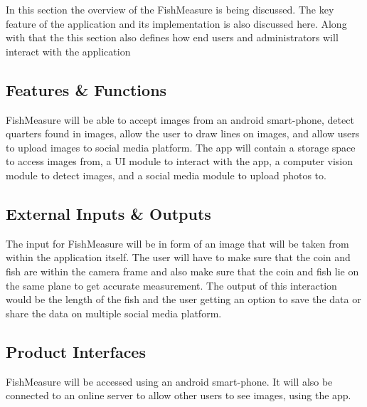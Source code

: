 In this section the overview of the FishMeasure is being discussed. The key feature of the application and its implementation is also discussed here. Along with that the this section also defines how end users and administrators will interact with the application

\subsection{Features \& Functions}
FishMeasure will be able to accept images from an android smart-phone, detect quarters found in images, allow the user to draw lines on images, and allow users to upload images to social media platform. The app will contain a storage space to access images from, a UI module to interact with the app, a computer vision module to detect images, and a social media module to upload photos to.

\subsection{External Inputs \& Outputs}
The input for FishMeasure will be in form of an image that will be taken from within the application itself. The user will have to make sure that the coin and fish are within the camera frame and also make sure that the coin and fish lie on the same plane to get accurate measurement. The output of this interaction would be the length of the fish and the user getting an option to save the data or share the data on multiple social media platform.

\subsection{Product Interfaces}
FishMeasure will be accessed using an android smart-phone. It will also be connected to an online server to allow other users to see images, using the app.